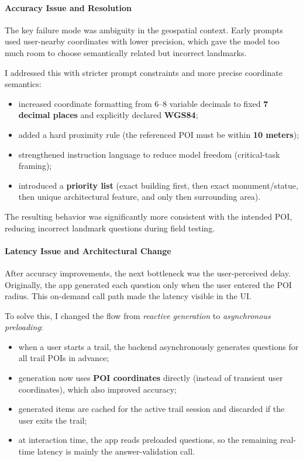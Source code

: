 \documentclass[11pt,a4paper]{article}
\begin{document}
\paragraph{Accuracy Issue and Resolution}
The key failure mode was ambiguity in the geospatial context.
Early prompts used user-nearby coordinates with lower precision, which gave the model too much room to choose semantically related but incorrect landmarks.

I addressed this with stricter prompt constraints and more precise coordinate semantics:

\begin{itemize}
    \item increased coordinate formatting from 6--8 variable decimals to fixed \textbf{7 decimal places} and explicitly declared \textbf{WGS84};
    \item added a hard proximity rule (the referenced POI must be within \textbf{10 meters});
    \item strengthened instruction language to reduce model freedom (critical-task framing);
    \item introduced a \textbf{priority list} (exact building first, then exact monument/statue, then unique architectural feature, and only then surrounding area).
\end{itemize}

The resulting behavior was significantly more consistent with the intended POI, reducing incorrect landmark questions during field testing.

\paragraph{Latency Issue and Architectural Change}
After accuracy improvements, the next bottleneck was the user-perceived delay.
Originally, the app generated each question only when the user entered the POI radius.
This on-demand call path made the latency visible in the UI.

To solve this, I changed the flow from \textit{reactive generation} to \textit{asynchronous preloading}:

\begin{itemize}
    \item when a user starts a trail, the backend asynchronously generates questions for all trail POIs in advance;
    \item generation now uses \textbf{POI coordinates} directly (instead of transient user coordinates), which also improved accuracy;
    \item generated items are cached for the active trail session and discarded if the user exits the trail;
    \item at interaction time, the app reads preloaded questions, so the remaining real-time latency is mainly the answer-validation call.
\end{itemize}
\end{document}
